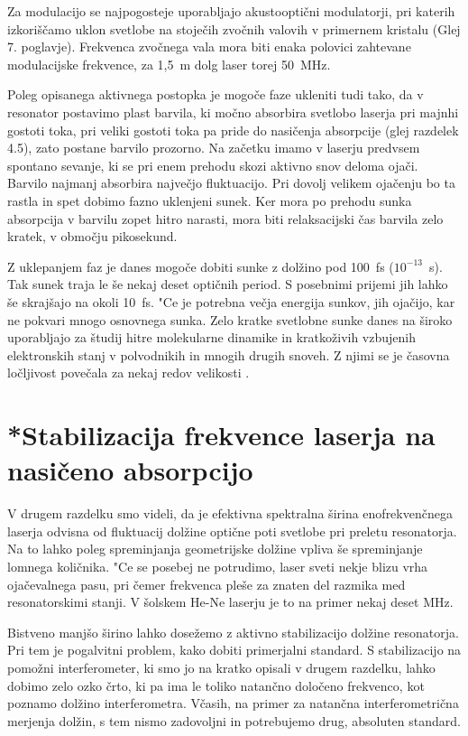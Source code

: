 Za modulacijo se najpogosteje uporabljajo akustooptični modulatorji, pri
katerih izkoriščamo uklon svetlobe na stoječih zvočnih valovih v
primernem kristalu (Glej 7. poglavje). Frekvenca zvočnega vala mora biti
enaka polovici zahtevane modulacijske frekvence, za 1,5~m dolg laser torej
50~MHz.

Poleg opisanega aktivnega postopka je mogoče faze ukleniti tudi tako, da v
resonator postavimo plast barvila, ki močno absorbira svetlobo laserja pri
majnhi gostoti toka, pri veliki gostoti toka pa pride do nasičenja
absorpcije (glej razdelek 4.5), zato postane barvilo prozorno. Na začetku
imamo v laserju predvsem spontano sevanje, ki se pri enem prehodu skozi
aktivno snov deloma ojači. Barvilo najmanj absorbira največjo fluktuacijo.
Pri dovolj velikem ojačenju bo ta rastla in spet dobimo fazno uklenjeni
sunek. Ker mora po prehodu sunka absorpcija v barvilu zopet hitro narasti,
mora biti relaksacijski čas barvila zelo kratek, v območju pikosekund.

Z uklepanjem faz je danes mogoče dobiti sunke z dolžino pod 100~fs ($%
10^{-13}$~s). Tak sunek traja le še nekaj deset optičnih period. S
posebnimi prijemi jih lahko še skrajšajo na okoli 10~fs. "Ce je potrebna
večja energija sunkov, jih ojačijo, kar ne pokvari mnogo osnovnega sunka.
Zelo kratke svetlobne sunke danes na široko uporabljajo za študij hitre
molekularne dinamike in kratkoživih vzbujenih elektronskih stanj v
polvodnikih in mnogih drugih snoveh. Z njimi se je časovna ločljivost
povečala za nekaj redov velikosti \cite{pikosekunde}.

\section{*Stabilizacija frekvence laserja na na\-sičeno absorpcijo}

V drugem razdelku smo videli, da je efektivna spektralna širina
eno\-frekvenčnega laserja odvisna od fluktuacij dolžine optične poti
svetlobe pri preletu resonatorja. Na to lahko poleg spreminjanja
geometrijske dolžine vpliva še spreminjanje lomnega količnika. "Ce se
posebej ne potrudimo, laser sveti nekje blizu vrha ojačevalnega pasu, pri
čemer frekvenca pleše za znaten del razmika med resonatorskimi stanji. V
šolskem He-Ne laserju je to na primer nekaj deset MHz.

Bistveno manjšo širino lahko dosežemo z aktivno stabilizacijo dolžine
resonatorja. Pri tem je pogalvitni problem, kako dobiti primerjalni
standard. S stabilizacijo na pomožni interferometer, ki smo jo na kratko
opisali v drugem razdelku, lahko dobimo zelo ozko črto, ki pa ima le toliko
natančno določeno frekvenco, kot poznamo dolžino interferometra. Včasih,
na primer za natančna interferometrična merjenja dolžin, s tem nismo
zadovoljni in potrebujemo drug, absoluten standard.

